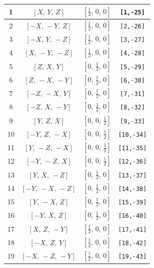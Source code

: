 \documentclass[fleqn,8pt]{jsarticle}
\begin{document}
\begin{longtable}{cccc}
1 & $\left[ X,\, Y,\, Z \right]$ & $\left[ \frac{1}{2},\, 0,\, 0 \right]$ & {\tt [1,-25]} \\ \hline
2 & $\left[ - X,\, - Y,\, Z \right]$ & $\left[ \frac{1}{2},\, 0,\, 0 \right]$ & {\tt [2,-26]} \\ \hline
3 & $\left[ - X,\, Y,\, - Z \right]$ & $\left[ \frac{1}{2},\, 0,\, 0 \right]$ & {\tt [3,-27]} \\ \hline
4 & $\left[ X,\, - Y,\, - Z \right]$ & $\left[ \frac{1}{2},\, 0,\, 0 \right]$ & {\tt [4,-28]} \\ \hline
5 & $\left[ Z,\, X,\, Y \right]$ & $\left[ 0,\, \frac{1}{2},\, 0 \right]$ & {\tt [5,-29]} \\ \hline
6 & $\left[ Z,\, - X,\, - Y \right]$ & $\left[ 0,\, \frac{1}{2},\, 0 \right]$ & {\tt [6,-30]} \\ \hline
7 & $\left[ - Z,\, - X,\, Y \right]$ & $\left[ 0,\, \frac{1}{2},\, 0 \right]$ & {\tt [7,-31]} \\ \hline
8 & $\left[ - Z,\, X,\, - Y \right]$ & $\left[ 0,\, \frac{1}{2},\, 0 \right]$ & {\tt [8,-32]} \\ \hline
9 & $\left[ Y,\, Z,\, X \right]$ & $\left[ 0,\, 0,\, \frac{1}{2} \right]$ & {\tt [9,-33]} \\ \hline
10 & $\left[ - Y,\, Z,\, - X \right]$ & $\left[ 0,\, 0,\, \frac{1}{2} \right]$ & {\tt [10,-34]} \\ \hline
11 & $\left[ Y,\, - Z,\, - X \right]$ & $\left[ 0,\, 0,\, \frac{1}{2} \right]$ & {\tt [11,-35]} \\ \hline
12 & $\left[ - Y,\, - Z,\, X \right]$ & $\left[ 0,\, 0,\, \frac{1}{2} \right]$ & {\tt [12,-36]} \\ \hline
13 & $\left[ Y,\, X,\, - Z \right]$ & $\left[ 0,\, \frac{1}{2},\, 0 \right]$ & {\tt [13,-37]} \\ \hline
14 & $\left[ - Y,\, - X,\, - Z \right]$ & $\left[ 0,\, \frac{1}{2},\, 0 \right]$ & {\tt [14,-38]} \\ \hline
15 & $\left[ Y,\, - X,\, Z \right]$ & $\left[ 0,\, \frac{1}{2},\, 0 \right]$ & {\tt [15,-39]} \\ \hline
16 & $\left[ - Y,\, X,\, Z \right]$ & $\left[ 0,\, \frac{1}{2},\, 0 \right]$ & {\tt [16,-40]} \\ \hline
17 & $\left[ X,\, Z,\, - Y \right]$ & $\left[ \frac{1}{2},\, 0,\, 0 \right]$ & {\tt [17,-41]} \\ \hline
18 & $\left[ - X,\, Z,\, Y \right]$ & $\left[ \frac{1}{2},\, 0,\, 0 \right]$ & {\tt [18,-42]} \\ \hline
19 & $\left[ - X,\, - Z,\, - Y \right]$ & $\left[ \frac{1}{2},\, 0,\, 0 \right]$ & {\tt [19,-43]} \\ \hline

\end{longtable}
\end{document}
